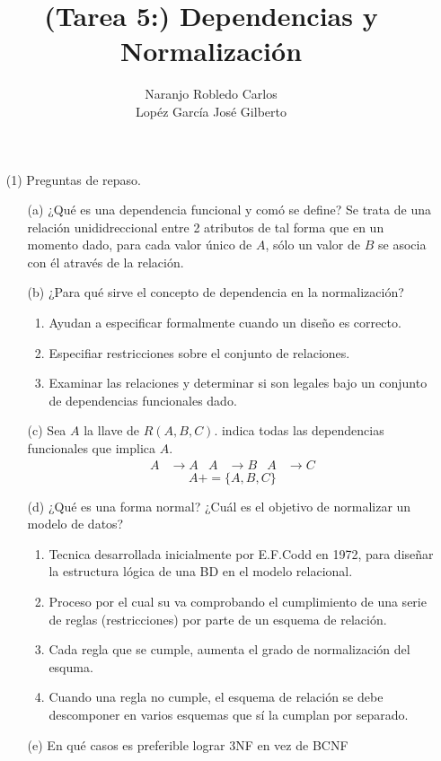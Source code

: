 \documentclass{article}
\title{(Tarea 5:) Dependencias y Normalización}
\author{Naranjo Robledo Carlos \\ Lopéz García José Gilberto}
\begin{document}
  \begin{enumerate}
    \item[(1)] Preguntas de repaso.
    \begin{enumerate}
      \item[(a)] ¿Qué es una dependencia funcional y comó se define?
      Se trata de una relación unididreccional entre 2 atributos de tal forma que
      en un momento dado, para cada valor único de $A$, sólo un valor de $B$ se
      asocia con él através de la relación.
      \item[(b)] ¿Para qué sirve el concepto de dependencia en la normalización?
        \begin{enumerate}
          \item Ayudan a especificar formalmente cuando un diseño es correcto.
          \item Especifiar restricciones sobre el conjunto de relaciones.
          \item Examinar las relaciones y determinar si son legales bajo un
          conjunto de dependencias funcionales dado.
        \end{enumerate}
      \item[(c)] Sea $A$ la llave de $R(A,B,C)$. indica todas las dependencias
      funcionales que implica $A$.
      \begin{align*}
        A &\rightarrow A & A &\rightarrow B & A &\rightarrow C
      \end{align*}
      $$ A += \{A,B,C\} $$
      \item[(d)] ¿Qué es una forma normal? ¿Cuál es el objetivo de normalizar un
      modelo de datos?
        \begin{enumerate}
          \item Tecnica desarrollada inicialmente por E.F.Codd en 1972, para diseñar la
          estructura lógica de una BD en el modelo relacional.
          \item Proceso por el cual su va comprobando el cumplimiento de una serie
          de reglas (restricciones) por parte de un esquema de relación.
          \item Cada regla que se cumple, aumenta el grado de normalización del
          esquma.
          \item Cuando una regla no cumple, el esquema de relación se debe
          descomponer en varios esquemas que sí la cumplan por separado.
        \end{enumerate}
      \item[(e)] En qué casos es preferible lograr 3NF en vez de BCNF


\end{enumerate}
\end{enumerate}
\end{document}
